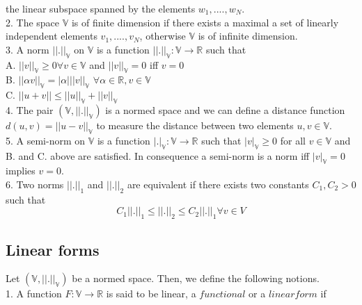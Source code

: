 \documentclass[a4paper,12pt]{book}
\begin{document}
the linear subspace spanned by the elements $w_1,....,w_N$.\\

2. The space $\mathbb{V}$ is of finite dimension if there exists a maximal a set of linearly independent elements $v_1,....,v_N$, otherwise $\mathbb{V}$ is of infinite dimension.\\

3. A norm $||.||_\mathbb{V}$ on $\mathbb{V}$ is a function $||.||_\mathbb{V} : \mathbb{V} \rightarrow \mathbb{R}$ such that\\ 
A. $||v||_\mathbb{V} \geq 0 \forall v \in \mathbb{V}$ and $||v||_\mathbb{V} = 0$ iff $v=0$\\
B. $||\alpha v||_\mathbb{V} = |\alpha| ||v||_\mathbb{V}$  $\forall \alpha \in \mathbb{R}, v \in \mathbb{V}$\\
C. $||u+v|| \leq ||u||_\mathbb{V} + ||v||_\mathbb{V}$\\

4. The pair $(\mathbb{V},||.||_\mathbb{V})$ is a normed space and we can define a distance function $d(u,v) = ||u-v||_\mathbb{V}$ to measure the distance between two elements $u,v \in \mathbb{V}$.\\

5. A semi-norm on $\mathbb{V}$ is a function $|.|_\mathbb{V} : \mathbb{V} \rightarrow \mathbb{R}$ such that $|v|_\mathbb{V} \geq 0$ for all $v \in \mathbb{V}$ and B. and C. above are satisfied. In consequence a semi-norm is a norm iff $|v|_\mathbb{V} = 0$ implies  $v = 0$.\\

6. Two norms $||.||_1$ and $||.||_2$ are equivalent if there exists two constants $C_1,C_2 > 0$ such that \\

\begin{equation} \label{norm_equivalent}
C_1||.||_1 \leq ||.||_2 \leq C_2 ||.||_1 \forall v \in V
\end{equation}

\subsection{Linear forms}

Let $(\mathbb{V,||.||_\mathbb{V}})$ be a normed space. Then, we define the following notions.\\

1. A function $F : \mathbb{V} \rightarrow \mathbb{R}$ is said to be linear, a $functional$ or a $linear form$ if  \\
\end{document}
